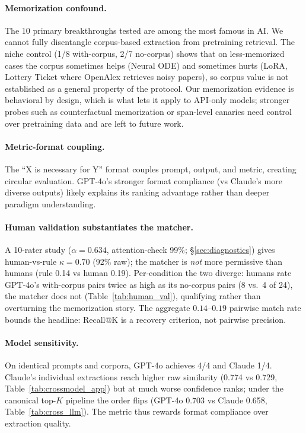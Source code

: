 \documentclass[11pt]{article}
\begin{document}
\paragraph{Memorization confound.}
The 10 primary breakthroughs tested are among the most famous in AI. We cannot fully disentangle corpus-based extraction from pretraining retrieval. The niche control (1/8 with-corpus, 2/7 no-corpus) shows that on less-memorized cases the corpus sometimes helps (Neural ODE) and sometimes hurts (LoRA, Lottery Ticket where OpenAlex retrieves noisy papers), so corpus value is not established as a general property of the protocol. Our memorization evidence is behavioral by design, which is what lets it apply to API-only models; stronger probes such as counterfactual memorization or span-level canaries need control over pretraining data and are left to future work.

\paragraph{Metric-format coupling.}
The ``X is necessary for Y'' format couples prompt, output, and metric, creating circular evaluation. GPT-4o's stronger format compliance (vs Claude's more diverse outputs) likely explains its ranking advantage rather than deeper paradigm understanding.

\paragraph{Human validation substantiates the matcher.}
A 10-rater study ($\alpha = 0.634$, attention-check 99\%; \S\ref{sec:diagnostics}) gives human-vs-rule $\kappa = 0.70$ (92\% raw); the matcher is \emph{not} more permissive than humans (rule 0.14 vs human 0.19). Per-condition the two diverge: humans rate GPT-4o's with-corpus pairs twice as high as its no-corpus pairs (8 vs.\ 4 of 24), the matcher does not (Table~\ref{tab:human_val}), qualifying rather than overturning the memorization story. The aggregate $0.14$--$0.19$ pairwise match rate bounds the headline: Recall@K is a recovery criterion, not pairwise precision.

\paragraph{Model sensitivity.}
On identical prompts and corpora, GPT-4o achieves 4/4 and Claude 1/4. Claude's individual extractions reach higher raw similarity (0.774 vs 0.729, Table~\ref{tab:crossmodel_app}) but at much worse confidence ranks; under the canonical top-$K$ pipeline the order flips (GPT-4o 0.703 vs Claude 0.658, Table~\ref{tab:cross_llm}). The metric thus rewards format compliance over extraction quality.
\end{document}
